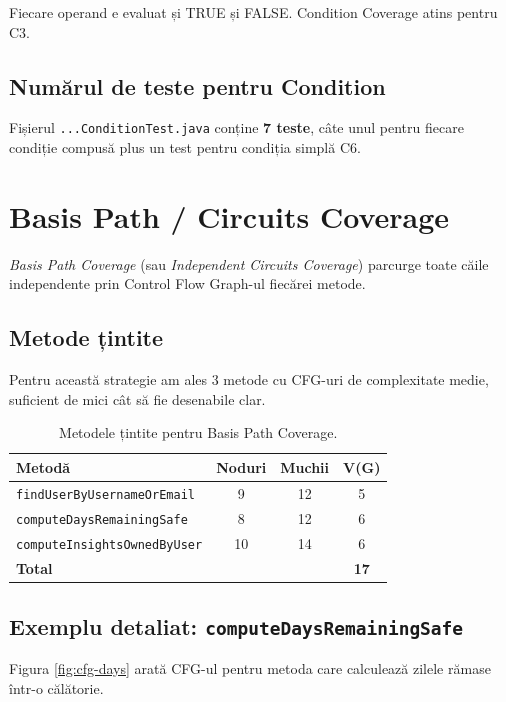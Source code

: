 Fiecare operand e evaluat și TRUE și FALSE. Condition Coverage atins pentru C3.

\subsection{Numărul de teste pentru Condition}

Fișierul \texttt{...ConditionTest.java} conține \textbf{7 teste}, câte unul pentru fiecare condiție compusă plus un test pentru condiția simplă C6.

\section{Basis Path / Circuits Coverage}
\label{sec:basis}

\textit{Basis Path Coverage} (sau \textit{Independent Circuits Coverage}) parcurge toate căile independente prin Control Flow Graph-ul fiecărei metode.

\subsection{Metode țintite}

Pentru această strategie am ales 3 metode cu CFG-uri de complexitate medie, suficient de mici cât să fie desenabile clar.

\begin{table}[!htb]
\centering
\caption{Metodele țintite pentru Basis Path Coverage.}
\label{tab:circuits}
\begin{tabular}{lccc}
\toprule
\textbf{Metodă} & \textbf{Noduri} & \textbf{Muchii} & \textbf{V(G)} \\
\midrule
\texttt{findUserByUsernameOrEmail} & 9 & 12 & 5 \\
\texttt{computeDaysRemainingSafe} & 8 & 12 & 6 \\
\texttt{computeInsightsOwnedByUser} & 10 & 14 & 6 \\
\midrule
\textbf{Total} & & & \textbf{17} \\
\bottomrule
\end{tabular}
\end{table}

\subsection{Exemplu detaliat: \texttt{computeDaysRemainingSafe}}

Figura \ref{fig:cfg-days} arată CFG-ul pentru metoda care calculează zilele rămase într-o călătorie.

